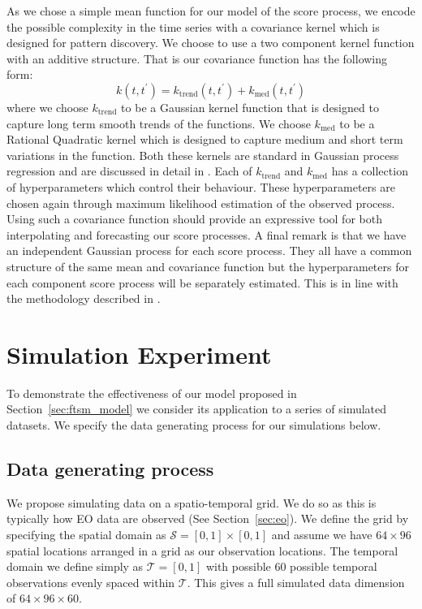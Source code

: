 As we chose a simple mean function for our model of the score process, we encode the possible complexity in the time series with a covariance kernel which is designed for pattern discovery. 
We choose to use a two component kernel function with an additive structure. 
That is our covariance function has the following form:
\begin{equation}
	k(t, t^\prime) = k_\text{trend}(t, t^\prime) + k_\text{med}(t, t^\prime)
\end{equation}
where we choose $k_{\text{trend}}$ to be a Gaussian kernel function that is designed to capture long term smooth trends of the functions.
We choose $k_{\text{med}}$ to be a Rational Quadratic kernel which is designed to capture medium and short term variations in the function.
Both these kernels are standard in Gaussian process regression and are discussed in detail in \citep{williams_gaussian_2006}. 
Each of $k_{\text{trend}}$ and $k_{\text{med}}$ has a collection of hyperparameters which control their behaviour.
These hyperparameters are chosen again through maximum likelihood estimation of the observed process.
Using such a covariance function should provide an expressive tool for both interpolating and forecasting our score processes.
A final remark is that we have an independent Gaussian process for each score process.
They all have a common structure of the same mean and covariance function but the hyperparameters for each component score process will be separately estimated.
This is in line with the methodology described in \citep{hyndman_forecasting_2009}. 

\section{Simulation Experiment \label{sec:ftsm_sim}}
To demonstrate the effectiveness of our model proposed in Section~\ref{sec:ftsm_model} we consider its application to a series of simulated datasets.
We specify the data generating process for our simulations below. 

\subsection{Data generating process \label{ftsm_sim_dgp}}
We propose simulating data on a spatio-temporal grid.
We do so as this is typically how EO data are observed (See Section~\ref{sec:eo}).
We define the grid by specifying the spatial domain as $\mathcal{S} = \left[0, 1\right] \times \left[0, 1\right]$ and assume we have $64 \times 96$ spatial locations arranged in a grid as our observation locations.
The temporal domain we define simply as $\mathcal{T} = \left[0, 1\right]$ with possible $60$ possible temporal observations evenly spaced within $\mathcal{T}$. 
This gives a full simulated data dimension of $64 \times 96 \times 60$. 

